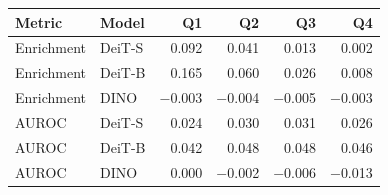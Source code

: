 \begin{tabular}{@{}llrrrr@{}}
\toprule
Metric & Model & Q1 & Q2 & Q3 & Q4 \\
\midrule
Enrichment & DeiT-S & 0.092 & 0.041 & 0.013 & 0.002 \\
Enrichment & DeiT-B & 0.165 & 0.060 & 0.026 & 0.008 \\
Enrichment & DINO & $-$0.003 & $-$0.004 & $-$0.005 & $-$0.003 \\
AUROC & DeiT-S & 0.024 & 0.030 & 0.031 & 0.026 \\
AUROC & DeiT-B & 0.042 & 0.048 & 0.048 & 0.046 \\
AUROC & DINO & 0.000 & $-$0.002 & $-$0.006 & $-$0.013 \\
\bottomrule
\end{tabular}
